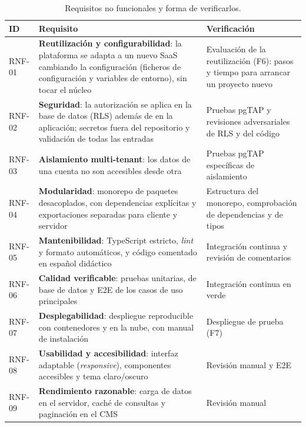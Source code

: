 \begin{table}[htbp]
  \centering
  \footnotesize
  \caption{Requisitos no funcionales y forma de verificarlos.}
  \label{tab:rnf}
  \begin{tabularx}{\textwidth}{@{}l>{\raggedright\arraybackslash}p{6.2cm}X@{}}
    \toprule
    \textbf{ID} & \textbf{Requisito} & \textbf{Verificación} \\
    \midrule
    RNF-01 & \textbf{Reutilización y configurabilidad}: la plataforma se adapta a un nuevo SaaS cambiando la configuración (ficheros de configuración y variables de entorno), sin tocar el núcleo & Evaluación de la reutilización (F6): pasos y tiempo para arrancar un proyecto nuevo \\
    RNF-02 & \textbf{Seguridad}: la autorización se aplica en la base de datos (RLS) además de en la aplicación; secretos fuera del repositorio y validación de todas las entradas & Pruebas pgTAP y revisiones adversariales de RLS y del código \\
    RNF-03 & \textbf{Aislamiento multi-tenant}: los datos de una cuenta no son accesibles desde otra & Pruebas pgTAP específicas de aislamiento \\
    RNF-04 & \textbf{Modularidad}: monorepo de paquetes desacoplados, con dependencias explícitas y exportaciones separadas para cliente y servidor & Estructura del monorepo, comprobación de dependencias y de tipos \\
    RNF-05 & \textbf{Mantenibilidad}: TypeScript estricto, \textit{lint} y formato automáticos, y código comentado en español didáctico & Integración continua y revisión de comentarios \\
    RNF-06 & \textbf{Calidad verificable}: pruebas unitarias, de base de datos y E2E de los casos de uso principales & Integración continua en verde \\
    RNF-07 & \textbf{Desplegabilidad}: despliegue reproducible con contenedores y en la nube, con manual de instalación & Despliegue de prueba (F7) \\
    RNF-08 & \textbf{Usabilidad y accesibilidad}: interfaz adaptable (\textit{responsive}), componentes accesibles y tema claro/oscuro & Revisión manual y E2E \\
    RNF-09 & \textbf{Rendimiento razonable}: carga de datos en el servidor, caché de consultas y paginación en el CMS & Revisión manual \\
    \bottomrule
  \end{tabularx}
\end{table}

